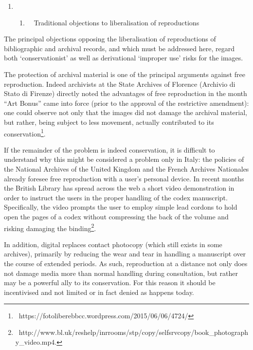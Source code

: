 \documentclass[amsthm,ebook]{saparticle}
\begin{document}
\begin{enumerate}
\item \begin{enumerate}
\item \ \ Traditional objections to liberalisation of reproductions
\end{enumerate}
\end{enumerate}
The principal objections opposing the liberalisation of reproductions of bibliographic and archival records, and which
must be addressed here, regard both ‘conservationist’ as well as derivational ‘improper use’ risks for the images.

The protection of archival material is one of the principal arguments against free reproduction. Indeed archivists at
the State Archives of Florence (Archivio di Stato di Firenze) directly noted the advantages of free reproduction in the
month “Art Bonus” came into force (prior to the approval of the restrictive amendment): one could observe not only that
the images did not damage the archival material, but rather, being subject to less movement, actually contributed to
its conservation\footnote{\ https://fotoliberebbcc.wordpress.com/2015/06/06/4724/}.

If the remainder of the problem is indeed conservation, it is difficult to understand why this might be considered a
problem only in Italy: the policies of the National Archives of the United Kingdom and the French Archives Nationales
already foresee free reproduction with a user’s personal device. In recent months the British Library has spread across
the web a short video demonstration in order to instruct the users in the proper handling of the codex manuscript.
Specifically, the video prompts the user to employ simple lead cordons to hold open the pages of a codex without
compressing the back of the volume and risking damaging the
binding\footnote{\ http://www.bl.uk/reshelp/inrrooms/stp/copy/selfsrvcopy/book\_photography\_video.mp4.}. 

In addition, digital replaces contact photocopy (which still exists in some archives), primarily by reducing the wear
and tear in handling a manuscript over the course of extended periods. As such, reproduction at a distance not only
does not damage media more than normal handling during consultation, but rather may be a powerful ally to its
conservation. For this reason it should be incentivised and not limited or in fact denied as happens today. 
\end{document}
